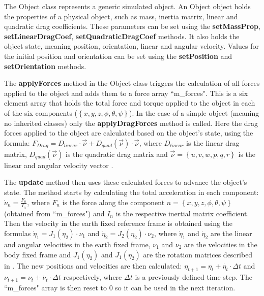 \documentclass[10pt,a4paper]{article}
\begin{document}
\par The Object class represents a generic simulated object. An Object object holds the properties of a physical object, such as mass, inertia matrix, linear and quadratic drag coefficients. These parameters can be set using the \textbf{setMassProp}, \textbf{setLinearDragCoef}, \textbf{setQuadraticDragCoef} methods. It also holds the object state, meaning position, orientation, linear and angular velocity. Values for the initial position and orientation can be set using the \textbf{setPosition} and \textbf{setOrientation} methods.

\par The \textbf{applyForces} method in the Object class triggers the calculation of all forces applied to the object and adds them to a force array ``m\_forces". This is a six element array that holds the total force and torque applied to the object in each of the six components ($\left\{x,y,z,\phi, \theta,\psi\right\}$). In the case of a simple object (meaning no inherited classes) only the \textbf{applyDragForces} method is called. Here the drag forces applied to the object are calculated based on the object's state, using the formula: $F_{Drag} = D_{linear} \cdot \vec{\nu} + D_{quad}\left(\vec{\nu}\right) \cdot \vec{\nu}$, where $D_{linear}$ is the linear drag matrix, $D_{quad}\left(\vec{\nu}\right)$ is the quadratic drag matrix and $\vec{\nu} = \left\{u,v,w,p,q,r\right\}$ is the linear and angular velocity vector \cite{braga}.

\par The \textbf{update} method then uses these calculated forces to advance the object's state. The method starts by calculating the total acceleration in each component: $\dot{\nu}_{n} = \frac{F_{n}}{I_{n}}$, where $F_{n}$ is the force along the component $n = \left\{x, y, z, \phi, \theta, \psi\right\}$ (obtained from ``m\_forces") and $I_{n}$ is the respective inertial matrix coefficient. Then the velocity in the earth fixed reference frame is obtained using the formulas $\dot{\eta}_1=J_{1}\left(\eta_2\right) \cdot \nu_1$ and $\dot{\eta}_2=J_{2}\left(\eta_2\right) \cdot \nu_2$, where $\dot{\eta}_1$ and $\dot{\eta}_2$ are the linear and angular velocities in the earth fixed frame, $\nu_1$ and $\nu_2$ are the velocities in the body fixed frame and $J_{1}\left(\eta_2\right)$ and $J_{1}\left(\eta_2\right)$ are the rotation matrices described in \cite{fossen}. The new positions and velocities are then calculated: $\eta_{t+1} = \eta_{t} + \dot{\eta_{t}} \cdot \Delta t$ and $\nu_{t+1} = \nu_{t} + \dot{\nu_{t}} \cdot \Delta t$ respectively, where $\Delta t$ is a previously defined time step. The ``m\_forces" array is then reset to 0 so it can be used in the next iteration.
\end{document}
